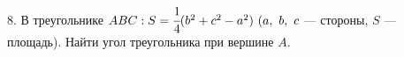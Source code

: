 8. В треугольнике $ABC: S=\cfrac{1}{4}(b^2+c^2-a^2)\ (a,\ b,\ c$ --- стороны, $S$ --- площадь). Найти угол треугольника при вершине $A.$\\
